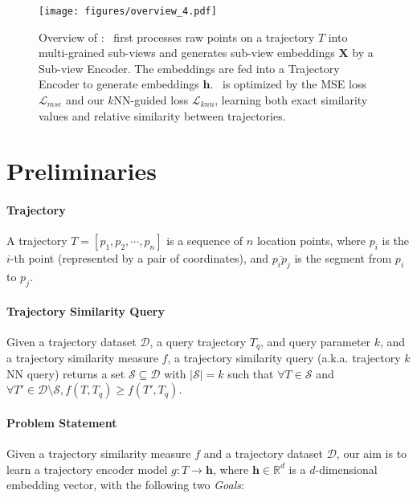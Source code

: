 \begin{figure*}[t]
    \centering
    \texttt{[image: figures/overview\_4.pdf]}
    \vspace{-2mm}
    \caption{Overview of \model: \model\ first processes raw  points on a trajectory $T$ into multi-grained sub-views and generates sub-view embeddings $\mathbf{X}$ by a Sub-view Encoder. The embeddings are fed into a Trajectory Encoder to generate embeddings $\mathbf{h}$. \model\ is optimized by the MSE loss $\mathcal{L}_{mse}$ and our $k$NN-guided loss $\mathcal{L}_{knn}$, learning both exact similarity values and relative similarity between trajectories.}\label{fig:overview}
    \vspace{-2mm}
\end{figure*}


\section{Preliminaries}\label{sec:preliminary}



\paragraph{Trajectory}
A trajectory $T= [p_1, p_2, \cdots, p_n]$ is a sequence of $n$ location points, where $p_i$ is the $i$-th point (represented by a pair of coordinates), and
$\overline{p_i p_j}$ is the segment from $p_i$ to $p_j$.

\paragraph{Trajectory Similarity Query}
Given a trajectory dataset $\mathcal{D}$, a query trajectory $T_q$, and query parameter $k$, and a trajectory similarity measure $f$, a trajectory similarity query (a.k.a. trajectory $k$NN query) returns a set $\mathcal{S} \subseteq \mathcal{D}$ with $|\mathcal{S}| = k$ such that $\forall T\in\mathcal{S}$ and $\forall T'\in\mathcal{D}\setminus \mathcal{S}, f(T, T_q) \geqslant f(T', T_q)$. 


\paragraph{Problem Statement}
Given a trajectory similarity measure $f$ and a trajectory dataset $\mathcal{D}$, our aim is to learn a trajectory encoder model $g: T \rightarrow \textbf{h}$, where $\textbf{h} \in \mathbb{R}^d$ is a $d$-dimensional embedding vector, with the following two \emph{Goals}:

